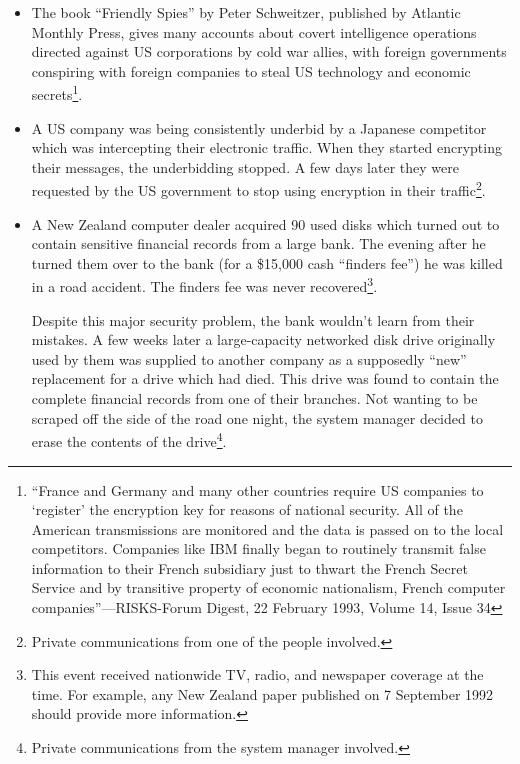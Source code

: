 \begin{itemize}
\item The book ``Friendly Spies'' by Peter Schweitzer, published by Atlantic
      Monthly Press, gives many accounts about covert intelligence operations
      directed \linebreak against US corporations by cold war allies, with foreign
      governments conspiring with foreign companies to steal US technology and
      economic secrets\footnote{
               ``France and Germany and many other countries require US companies
                to `register' the encryption key for reasons of national
                security.  All of the American transmissions are monitored and
                the data is passed on to the local competitors.  Companies like
                IBM finally began to routinely transmit false information to
                their French subsidiary just to thwart the French Secret Service
                and by transitive property of economic nationalism, French
                computer companies''---RISKS-Forum Digest, 22 February 1993,
                Volume 14, Issue 34
}.

\item A US company was being consistently underbid by a Japanese competitor
      which was intercepting their electronic traffic.  When they started
      encrypting their messages, the underbidding stopped.  A few days later
      they were requested by the US government to stop using encryption in
      their traffic\footnote{
              Private communications from one of the people involved.
}.

\item A New Zealand computer dealer acquired 90 used disks which turned out to
      contain sensitive financial records from a large bank.  The evening after
      he turned them over to the bank (for a \$15,000 cash ``finders fee'') he was
      killed in a road accident.  The finders fee was never recovered\footnote{
              This event received nationwide TV, radio, and newspaper coverage
              at the time.  For example, any New Zealand paper published on 7
              September 1992 should provide more information.
}.

      Despite this major security problem, the bank wouldn't learn from their
      mistakes.  A few weeks later a large-capacity networked disk drive
      originally used by them was supplied to another company as a supposedly
      ``new'' replacement for a drive which had died.  This drive was found to
      contain the complete financial records from one of their branches.  Not
      wanting to be scraped off the side of the road one night, the system
      manager decided to erase the contents of the drive\footnote{
              Private communications from the system manager involved.
}.


\end{itemize}
